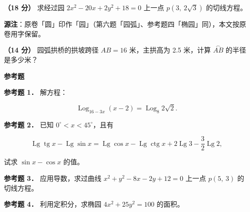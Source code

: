 \begin{question}
\textbf{（18 分）} 求经过园 $2x^2-20x+2y^2+18=0$ 上一点 $p(3,\ 2\sqrt3)$ 的切线方程。

\begin{gktip}
\textbf{源注}：原卷「圆」印作「园」（第六题「园弧」、参考题四「椭园」同），本文按原卷用字保留。
\end{gktip}

\Needspace{0.4\textheight}
\end{question}
\begin{question}
\textbf{（14 分）} 园弧拱桥的拱坡跨径 $AB=16$ 米，主拱高为 2.5 米，计算 $\overset{\frown}{AB}$ 的半径是多少米？
\nopagebreak[4]
\begin{center}\end{center}
\nopagebreak[4]
\begin{gktip}
\textbf{参考题}
\end{gktip}

\textbf{参考题 1．} 解方程：

\nopagebreak[4]
\[
\operatorname{Log}_{16-3x}(x-2)=\operatorname{Log}_8 2\sqrt2.
\]

\textbf{参考题 2．} 已知 $0^\circ<x<45^\circ$，且有

\nopagebreak[4]
\[
\operatorname{Lg}\operatorname{tg}x-\operatorname{Lg}\sin x
=\operatorname{Lg}\cos x-\operatorname{Lg}\operatorname{ctg}x
+2\operatorname{Lg}3-\frac{3}{2}\operatorname{Lg}2,
\]

试求 $\sin x-\cos x$ 的值。

\textbf{参考题 3．} 应用导数，求过曲线 $x^2+y^2-8x-2y+12=0$ 上一点 $p(5,\ 3)$ 的切线方程。

\textbf{参考题 4．} 利用定积分，求椭园 $4x^2+25y^2=100$ 的面积。

\end{question}